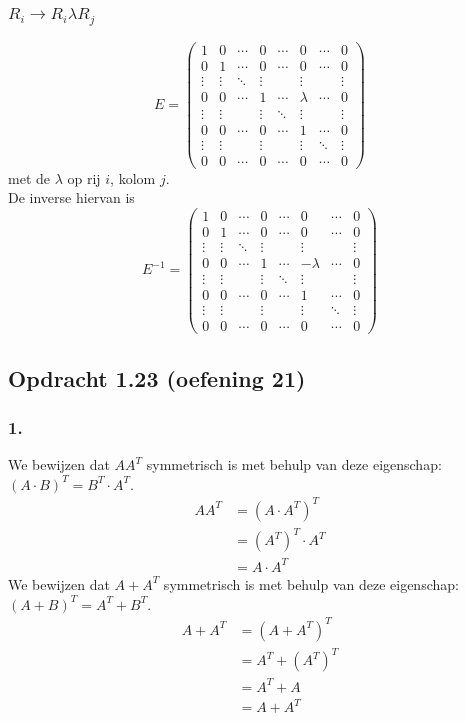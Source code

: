 \documentclass[lineaire_algebra_oplossingen.tex]{subfiles}
\begin{document}
\subsubsection*{$R_i \rightarrow R_i \lambda R_j$}
\[
E=
\begin{pmatrix}
1 & 0 & \cdots & 0 & \cdots & 0 & \cdots & 0\\
0 & 1 & \cdots & 0 & \cdots & 0 & \cdots & 0\\
\vdots & \vdots & \ddots & \vdots& & \vdots & &\vdots\\
0 & 0 & \cdots & 1 & \cdots & \lambda & \cdots & 0\\
\vdots & \vdots & & \vdots& \ddots & \vdots & &\vdots\\
0 & 0 & \cdots & 0 & \cdots & 1 & \cdots & 0\\
\vdots & \vdots & & \vdots & & \vdots & \ddots & \vdots\\
0 & 0 & \cdots & 0 & \cdots & 0 & \cdots & 0
\end{pmatrix}
\]
met de $\lambda$ op rij $i$, kolom $j$.\\
De inverse hiervan is 
\[
E^{-1}=
\begin{pmatrix}
1 & 0 & \cdots & 0 & \cdots & 0 & \cdots & 0\\
0 & 1 & \cdots & 0 & \cdots & 0 & \cdots & 0\\
\vdots & \vdots & \ddots & \vdots& & \vdots & &\vdots\\
0 & 0 & \cdots & 1 & \cdots & -\lambda & \cdots & 0\\
\vdots & \vdots & & \vdots& \ddots & \vdots & &\vdots\\
0 & 0 & \cdots & 0 & \cdots & 1 & \cdots & 0\\
\vdots & \vdots & & \vdots & & \vdots & \ddots & \vdots\\
0 & 0 & \cdots & 0 & \cdots & 0 & \cdots & 0
\end{pmatrix}
\]

\subsection{Opdracht 1.23 (oefening 21)}
\label{1.23}
\subsubsection*{1.}
We bewijzen dat $AA^T$ symmetrisch is met behulp van deze eigenschap: $(A\cdot B)^T = B^T \cdot A^T$.
\begin{align*}
AA^T
&= (A\cdot A^T)^T\\
&= (A^T)^T \cdot A^T \\
&= A \cdot A^T
\end{align*}
We bewijzen dat $A+A^T$ symmetrisch is met behulp van deze eigenschap: $(A+B)^T = A^T + B^T$.
\begin{align*}
A +A^T
&= (A +A^T)^T \\
&= A^T + (A^T)^T \\
&= A^T + A \\
&= A + A^T
\end{align*}
\end{document}
